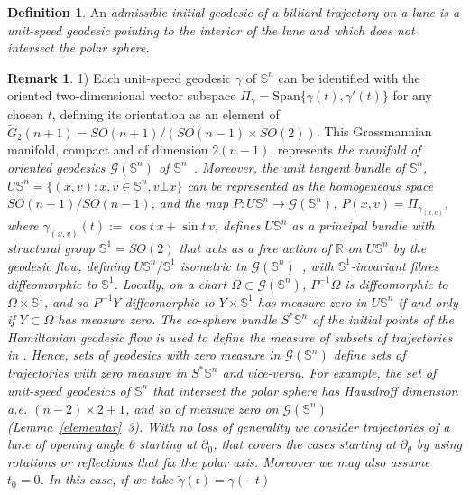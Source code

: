 \documentclass[11pt,a4paper,times]{amsart}
\theoremstyle{plain}
\theoremstyle{definition}
\newtheorem{definition}[thm]{Definition}%
\newtheorem{remark}{Remark}[section]
\numberwithin{equation}{section}
\newcommand{\R}{\mathbb{R}}
\newcommand{\Se}{\mathbb{S}}
\newcommand{\txtg}{\textcolor{green}}
\begin{document}
%
\begin{definition}\label{admissibility}
An \em admissible \em  initial geodesic of a billiard trajectory on a lune is  a unit-speed geodesic pointing to the interior of the lune and which
does not intersect the polar sphere.
\end{definition}
\begin{remark}\label{zeromeasure}
1)  Each unit-speed geodesic $\gamma$ of $\mathbb{S}^n$ can be identified with the oriented two-dimensional vector subspace $\Pi_{\gamma}=\mathrm{Span}\{\gamma(t), \gamma'(t)\}$
for any chosen $t$, defining its orientation
as an  element of $\tilde{G}_2(n+1)=SO(n+1)/(SO(n-1)\times SO(2))$. This Grassmannian manifold, compact and of dimension $2(n-1)$, represents
\em the manifold of oriented geodesics \em  $\mathcal{G}(\Se^n)$ of $\Se^n$~\cite[Example~2.8]{Be}. 
 Moreover, the   unit tangent bundle of $\Se^n$,
 $U\Se^n= \{(x,v): x,v\in \Se^n, v\bot x \}$
 can be represented as the homogeneous space  $SO(n+1)/SO(n-1)$, and the map $P:U\Se^n\to \mathcal{G}(\Se^n)$,
 $P(x,v)= \Pi_{\gamma_{(x,v)}}$, where $\gamma_{(x,v)}(t):=\cos t \, x +\sin t\, v$, defines $U\Se^n$ as a principal bundle with structural
 group $\Se^1=SO(2)$ that acts as a free action of $\R$ on $U\Se^n$  by the geodesic flow, defining   $U\Se^n/\Se^1$  isometric tn
 $\mathcal{G}(\Se^n)$~\cite[2.5]{Be}, with $\Se^1$-invariant fibres diffeomorphic to $\Se^1$. Locally, on a chart $\Omega\subset \mathcal{G}(\Se^n)$,  $P^{-1}\Omega$
 is  diffeomorphic to  $\Omega \times \Se^1$, and so   $P^{-1}Y$ diffeomorphic to $Y\times \Se^1$ has measure zero in $U\Se^n$ if and only if
 $Y\subset \Omega$ has measure zero.  The co-sphere bundle $S^*\Se^n$ of the initial points  of the Hamiltonian geodesic flow is used to define
 the measure of subsets of trajectories in \cite{sava}. Hence, sets of geodesics with zero measure in $\mathcal{G}(\Se^n)$ define sets of trajectories
 with zero measure in $S^*\Se^n$ and vice-versa. {For example, the set of unit-speed  geodesics of $\Se^n$ that intersect the polar sphere has Hausdroff dimension {a.e.} $(n-2)\times 2 + 1$, and so of measure zero on $\mathcal{G}(\Se^n)$ (Lemma~\ref{elementar}~3). With no loss of generality
 we consider trajectories of a lune of opening angle $\theta$ starting at $\partial_0$, that covers the cases starting at $\partial_{\theta}$
 by using rotations or reflections that fix the polar axis. Moreover we may also assume $t_0=0$. In this case,  if we take  $\tilde{\gamma}(t)=\gamma(-t)$
}
\end{remark}
\end{document}
